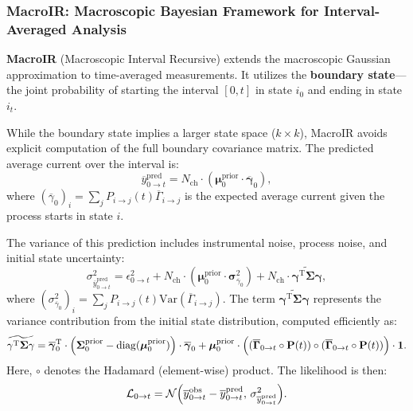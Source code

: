 \documentclass[9pt]{elife}
\begin{document}
\subsubsection{MacroIR: Macroscopic Bayesian Framework for Interval-Averaged Analysis}
\textbf{MacroIR} (Macroscopic Interval Recursive) extends the macroscopic Gaussian approximation to time-averaged measurements. It utilizes the \textbf{boundary state}—the joint probability of starting the interval \([0, t]\) in state \(i_0\) and ending in state \(i_t\).

While the boundary state implies a larger state space ($k \times k$), MacroIR avoids explicit computation of the full boundary covariance matrix. The predicted average current over the interval is:
\begin{equation}
	\overline{y}^{\text{pred}}_{0 \rightarrow t} = N_{\text{ch}} \cdot (\boldsymbol{\mu}^{\text{prior}}_{0} \cdot \overline{\boldsymbol{\gamma}}_{0}),
	\label{eq:macro_interval_predicted_y}
\end{equation}
where \( (\overline{\gamma}_{0})_i = \sum_j P_{i\rightarrow j}(t) \overline{\Gamma}_{i \rightarrow j} \) is the expected average current given the process starts in state \(i\).

The variance of this prediction includes instrumental noise, process noise, and initial state uncertainty:
\begin{equation}
	\sigma^2_{\overline{y}^{\text{pred}}_{0 \rightarrow t}} = \epsilon^2_{0 \rightarrow t} + N_{\text{ch}} \cdot (\boldsymbol{\mu}^{\text{prior}}_{0} \cdot \boldsymbol{\sigma}^2_{\overline{\gamma}_{0}}) + N_{\text{ch}} \cdot \widetilde{\mathbf{\gamma}^{\mathrm{T}} \mathbf{\Sigma}\mathbf{\gamma}},
	\label{eq:macro_interval_sigma_pred}
\end{equation}
where \( (\sigma^2_{\overline{\gamma}_{0}})_i = \sum_j P_{i\rightarrow j}(t) \mathrm{Var}(\overline{\Gamma}_{i\rightarrow j}) \). The term \( \widetilde{\mathbf{\gamma}^{\mathrm{T}} \mathbf{\Sigma}\mathbf{\gamma}} \) represents the variance contribution from the initial state distribution, computed efficiently as:
\begin{equation}
	\widetilde{\mathbf{\gamma}^{\mathrm{T}} \mathbf{\Sigma}\mathbf{\gamma}} = \overline{\boldsymbol{\gamma}}_{0}^{\mathrm{T}} \cdot \Bigl( \boldsymbol{\Sigma}^{\text{prior}}_{0} - \mathrm{diag}(\boldsymbol{\mu}^{\text{prior}}_0) \Bigr) \cdot \overline{\boldsymbol{\gamma}}_{0} 
	+ \boldsymbol{\mu}^{\text{prior}}_0 \cdot \Bigl( (\overline{\mathbf{\Gamma}}_{0 \rightarrow t} \circ \mathbf{P}(t)) \circ (\overline{\mathbf{\Gamma}}_{0 \rightarrow t} \circ \mathbf{P}(t)) \Bigr) \cdot \mathbf{1}. 
	\label{eq:simplified_boundary_state}
\end{equation}
Here, $\circ$ denotes the Hadamard (element-wise) product. The likelihood is then:
\begin{equation}
	\mathcal{L}_{0 \rightarrow t} = \mathcal{N}\Bigl( \overline{y}^{\text{obs}}_{0 \rightarrow t} - \overline{y}^{\text{pred}}_{0 \rightarrow t},\, \sigma^2_{\overline{y}^{\text{pred}}_{0 \rightarrow t}} \Bigr).
\end{equation}
\end{document}
